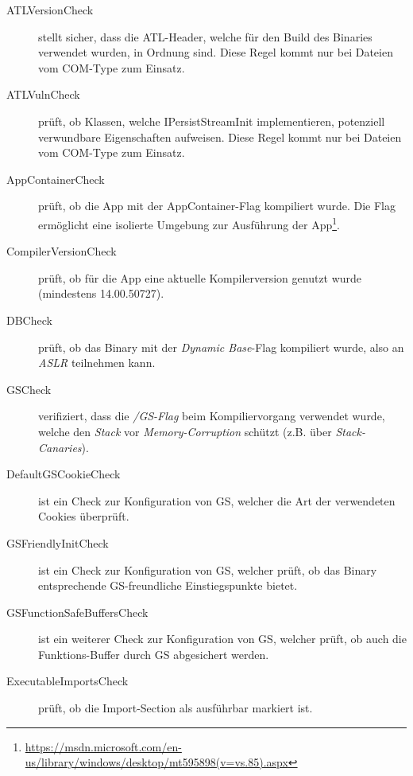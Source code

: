 
\begin{description}
	\item[ATLVersionCheck] stellt sicher, dass die ATL-Header, welche für den Build des Binaries verwendet wurden, in Ordnung sind. Diese Regel kommt nur bei Dateien vom COM-Type zum Einsatz.
	
	\item[ATLVulnCheck] prüft, ob Klassen, welche IPersistStreamInit implementieren, potenziell verwundbare Eigenschaften aufweisen. Diese Regel kommt nur bei Dateien vom COM-Type zum Einsatz.
	
	\item[AppContainerCheck] prüft, ob die App mit der AppContainer-Flag kompiliert wurde. Die Flag ermöglicht eine isolierte Umgebung zur Ausführung der App\footnote{\url{https://msdn.microsoft.com/en-us/library/windows/desktop/mt595898(v=vs.85).aspx}}.
	
	\item[CompilerVersionCheck] prüft, ob für die App eine aktuelle Kompilerversion genutzt wurde (mindestens 14.00.50727).
	
	\item[DBCheck] prüft, ob das Binary mit der \textit{Dynamic Base}-Flag kompiliert wurde, also an \textit{ASLR} teilnehmen kann.
	
	\item[GSCheck] verifiziert, dass die \textit{/GS-Flag} beim Kompiliervorgang verwendet wurde, welche den \textit{Stack} vor \textit{Memory-Corruption} schützt (z.B. über \textit{Stack-Canaries}). 
	
	\item[DefaultGSCookieCheck] ist ein Check zur Konfiguration von GS, welcher die Art der verwendeten Cookies überprüft.
	
	\item[GSFriendlyInitCheck] ist ein Check zur Konfiguration von GS, welcher prüft, ob das Binary entsprechende GS-freundliche Einstiegspunkte bietet.
	
	\item[GSFunctionSafeBuffersCheck] ist ein weiterer Check zur Konfiguration von GS, welcher prüft, ob auch die Funktions-Buffer durch GS abgesichert werden.
	
	\item[ExecutableImportsCheck] prüft, ob die Import-Section als ausführbar markiert ist.
	

\end{description}
